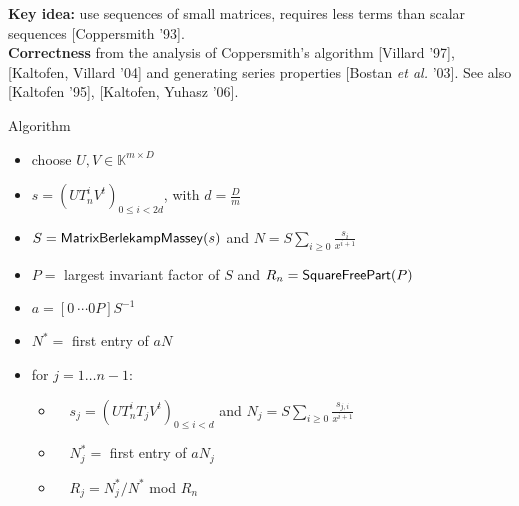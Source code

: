 \documentclass[final]{beamer}
\newlength{\twocolwid}
\begin{document}
\begin{frame}[t]
\begin{columns}[t]
\begin{column}{\twocolwid}

\textbf{Key idea:} use sequences of small matrices, requires less
terms than scalar sequences [Coppersmith '93]. \\ \textbf{Correctness}
 from the analysis of Coppersmith's algorithm [Villard '97],
[Kaltofen, Villard '04] and generating series properties
[Bostan {\it et al.} '03].  See also [Kaltofen '95], [Kaltofen, Yuhasz '06].

\vspace{1em}

	
	\begin{alertblock}{{\sf Algorithm}}
		\begin{itemize}
			\item[] {\sf choose $U,V \in \mathbb{K}^{m \times D}$}
			\item[] {\sf $s= (UT_n^iV^t)_{0 \le i < 2d}$, with $d = \frac{D}{m}$}
			\item[] {\sf $S = {\sf MatrixBerlekampMassey}(s)$ and $N = S\sum_{i\ge 0} \frac{s_i}{x^{i+1}}$}
			\item[] {\sf $P=$ largest invariant factor of $S$ and $R_n={\sf SquareFreePart}(P)$}
                        \item[] {\sf $a = [0 ~\cdots 0 P] S^{-1}$}
			\item[] {\sf $N^*=$ first entry of $aN$}
			\item[] {\sf for $j = 1 \dots n-1$:}
			\begin{itemize}
			\item[] ~~{\sf $s_j = (UT_n^i T_j V^t)_{0 \le i < d}$ and $N_j = S\sum_{i\ge 0} \frac{s_{j,i}}{x^{i+1}}$}
                        \item[] ~~{\sf $N^*_j=$ first entry of $aN_j$}
			\item[] ~~{\sf $R_j=N^*_j/N^*$ mod $R_n$}
			\end{itemize}
		\end{itemize}
	\end{alertblock}



\end{column}
\end{columns}
\end{frame}
\end{document}
